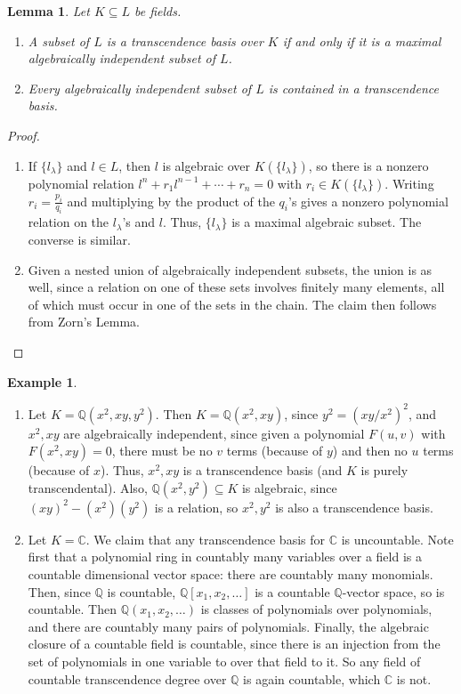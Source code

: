 \documentclass{amsart}[12pt]
\newcommand{\Q}{\mathbb{Q}}
\newcommand{\C}{\mathbb{C}}
\numberwithin{equation}{section}
\theoremstyle{plain} %
\newtheorem{lem}[equation]{Lemma}
\theoremstyle{definition}
\newtheorem{ex}[equation]{Example}
\theoremstyle{remark}
\begin{document}
\begin{lem} Let $K\subseteq L$ be fields.
\begin{enumerate}
\item A subset of $L$ is a transcendence basis over $K$ if and only if it is a maximal algebraically independent subset of $L$.
\item Every algebraically independent subset of $L$ is contained in a transcendence basis.
\end{enumerate}
\end{lem}
\begin{proof}
\begin{enumerate}
\item If  $\{l_\lambda\}$ and $l\in L$, then $l$ is algebraic over $K(\{l_\lambda\})$, so there is a nonzero polynomial relation $l^n + {r_1} l^{n-1} + \cdots + r_n = 0$ with $r_i\in K(\{l_\lambda\})$. Writing $r_i=\frac{p_i}{q_i}$ and multiplying by the product of the $q_i$'s gives a nonzero polynomial relation on the $l_\lambda$'s and $l$. Thus, $\{l_\lambda\}$ is a maximal algebraic subset. The converse is similar.
\item Given a nested union of algebraically independent subsets, the union is as well, since a relation on one of these sets involves finitely many elements, all of which must occur in one of the sets in the chain. The claim then follows from Zorn's Lemma.\qedhere
\end{enumerate}
\end{proof}

\begin{ex}
\begin{enumerate}
\item
Let $K=\Q(x^2,xy,y^2)$. Then $K=\Q(x^2,xy)$, since $y^2=(xy/x^2)^2$, and $x^2,xy$ are algebraically independent, since given a polynomial $F(u,v)$ with $F(x^2,xy)=0$, there must be no $v$ terms (because of $y$) and then no $u$ terms (because of $x$). Thus, $x^2,xy$ is a transcendence basis (and $K$ is purely transcendental). Also, $\Q(x^2,y^2)\subseteq K$ is algebraic, since $(xy)^2 - (x^2)(y^2)$ is a relation, so $x^2,y^2$ is also a transcendence basis.

\item Let $K=\C$. We claim that any transcendence basis for $\C$ is uncountable. Note first that a polynomial ring in countably many variables over a field is a countable dimensional vector space: there are countably many monomials. Then, since $\Q$ is countable, $\Q[x_1,x_2,\dots]$ is a countable $\Q$-vector space, so is countable. Then $\Q(x_1,x_2,\dots)$ is classes of polynomials over polynomials, and there are countably many pairs of polynomials. Finally, the algebraic closure of a countable field is countable, since there is an injection from the set of polynomials in one variable to over that field to it. So any field of countable transcendence degree over $\Q$ is again countable, which $\C$ is not.
\end{enumerate}
\end{ex}
\end{document}
